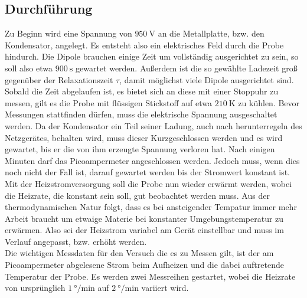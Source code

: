 \subsection{Durchführung}
Zu Beginn wird eine Spannung von $\SI{950}{\volt}$ an die Metallplatte, bzw. den Kondensator, angelegt. Es entsteht also ein elektrisches 
Feld durch die Probe hindurch. Die Dipole brauchen einige Zeit um vollständig ausgerichtet zu sein,
so soll also etwa $\SI{900}{\second}$ gewartet werden.
Außerdem ist die so gewählte Ladezeit groß gegenüber der Relaxationszeit $\tau$, damit möglichst viele Dipole ausgerichtet sind.
Sobald die Zeit abgelaufen ist, es bietet sich an diese mit einer Stoppuhr zu messen,
gilt es die Probe mit flüssigen Stickstoff auf etwa $\SI{210}{\kelvin}$ zu kühlen.
Bevor Messungen stattfinden dürfen, muss die elektrische Spannung ausgeschaltet werden.
Da der Kondensator ein Teil seiner Ladung, auch nach herunterregeln des Netzgerätes, behalten wird,
muss dieser Kurzgeschlossen werden und es wird gewartet, bis er die von ihm erzeugte Spannung verloren hat.
Nach einigen Minuten darf das Picoampermeter angeschlossen werden. Jedoch muss,
wenn dies noch nicht der Fall ist, darauf gewartet werden bis der Stromwert konstant ist.
Mit der Heizstromversorgung soll die Probe nun wieder erwärmt werden, wobei die 
Heizrate, die konstant sein soll, gut beobachtet werden muss. Aus der thermodynamischen Natur 
folgt, dass es bei ansteigender Tempatur immer mehr Arbeit braucht um etwaige Materie bei 
konstanter Umgebungstemperatur zu erwärmen. Also sei der Heizstrom variabel am Gerät
einstellbar und muss im Verlauf angepasst, bzw. erhöht werden.
\\
\newline
Die wichtigen Messdaten für den Versuch die es zu Messen gilt, ist der am Picoampermeter 
abgelesene Strom beim Aufheizen und die dabei auftretende Temperatur der Probe.
Es werden zwei Messreihen gestartet, wobei die Heizrate von ursprünglich $\SI{1}{\degree\per\minute}$
auf $\SI{2}{\degree\per\minute}$ variiert wird.